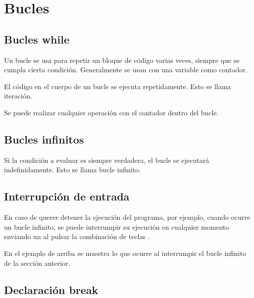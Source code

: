 \chapter{Bucles}

\section{Bucles while}

Un bucle  se usa para repetir un bloque de código varias veces, siempre que se cumpla cierta condición.
Generalmente se usan con una variable como contador.


El código en el cuerpo de un bucle  se ejecuta repetidamente.
Esto se llama iteración.

Se puede realizar cualquier operación con el contador dentro del bucle.


\section{Bucles infinitos}

Si la condición a evaluar es siempre verdadera, el bucle se ejecutará indefinidamente.
Esto se llama bucle infinito.


\section{Interrupción de entrada}

En caso de querer detener la ejecución del programa, por ejemplo, cuando ocurre un bucle infinito, se puede interrumpir su ejecución en cualquier momento enviando un  al pulsar la combinación de teclas .


En el ejemplo de arriba se muestra lo que ocurre al interrumpir el bucle  infinito de la sección anterior.

\section{Declaración break}

